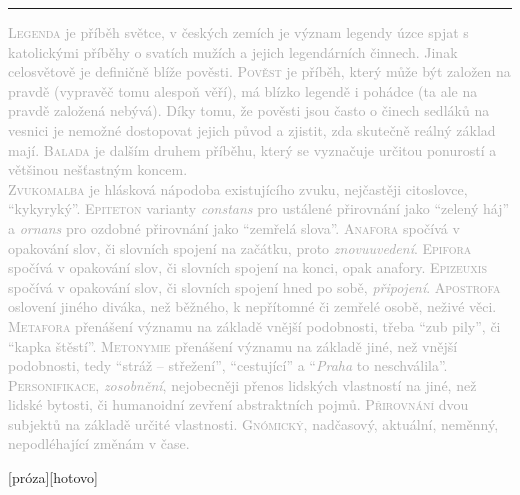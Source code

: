 \documentclass{extarticle} %
\begin{document}
\noindent\begin{minipage}{\textwidth}
    \textcolor{darkgray}{\rule{\linewidth}{0.4pt}
    \changefontsize{7pt}
    \footnotesize
    \textsc{Legenda} je příběh světce, v českých zemích je význam legendy úzce spjat s katolickými příběhy o svatích mužích a jejich legendárních činnech. Jinak celosvětově je definičně blíže pověsti.
    \textsc{Pověst} je příběh, který může být založen na pravdě (vypravěč tomu alespoň věří), má blízko legendě i pohádce (ta ale na pravdě založená nebývá). Díky tomu, že pověsti jsou často o činech sedláků na vesnici je nemožné dostopovat jejich původ a zjistit, zda skutečně reálný základ mají.
    \textsc{Balada} je dalším druhem příběhu, který se vyznačuje určitou ponurostí a většinou nešťastným koncem. \\
    \textsc{Zvukomalba} je hlásková nápodoba existujícího zvuku, nejčastěji citoslovce, \enquote{kykyryký}.
    \textsc{Epiteton} varianty \textit{constans} pro ustálené přirovnání jako \enquote{zelený háj} a \textit{ornans} pro ozdobné přirovnání jako \enquote{zemřelá slova}.
    \textsc{Anafora} spočívá v opakování slov, či slovních spojení na začátku, proto \textit{znovuuvedení}.
    \textsc{Epifora} spočívá v opakování slov, či slovních spojení na konci, opak anafory.
    \textsc{Epizeuxis} spočívá v opakování slov, či slovních spojení hned po sobě, \textit{připojení}.
    \textsc{Apostrofa} oslovení jiného diváka, než běžného, k nepřítomné či zemřelé osobě, neživé věci.
    \textsc{Metafora} přenášení významu na základě vnější podobnosti, třeba \enquote{zub pily}, či \enquote{kapka štěstí}.
    \textsc{Metonymie} přenášení významu na základě jiné, než vnější podobnosti, tedy \enquote{stráž -- střežení}, \enquote{cestující} a \enquote{\textit{Praha} to neschválila}.
    \textsc{Personifikace}, \textit{zosobnění}, nejobecněji přenos lidských vlastností na jiné, než lidské bytosti, či humanoidní zevření abstraktních pojmů.
    \textsc{Přirovnání} dvou subjektů na základě určité vlastnosti.
    \textsc{Gnómický}, nadčasový, aktuální, neměnný, nepodléhající změnám v čase.
    }
\end{minipage}

\newpage


\changefontsize{8pt}

[próza][hotovo]
\end{document}
